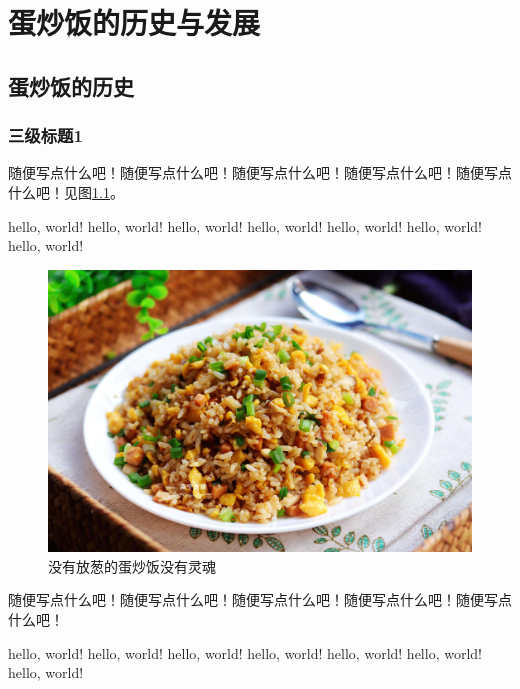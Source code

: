 \chapter{蛋炒饭的历史与发展}
\section{蛋炒饭的历史}
\subsection{三级标题1}
随便写点什么吧！随便写点什么吧！随便写点什么吧！随便写点什么吧！随便写点什么吧！见图\ref{fig:my_label}。

hello, world! hello, world! hello, world! hello, world! hello, world! hello, world! hello, world!

\begin{figure}[h]
    \centering
    \includegraphics[scale=0.1]{imgs/蛋炒饭.jpeg}
    \caption{没有放葱的蛋炒饭没有灵魂}
    \label{fig:my_label}
\end{figure}

随便写点什么吧！随便写点什么吧！随便写点什么吧！随便写点什么吧！随便写点什么吧！

hello, world! hello, world! hello, world! hello, world! hello, world! hello, world! hello, world!